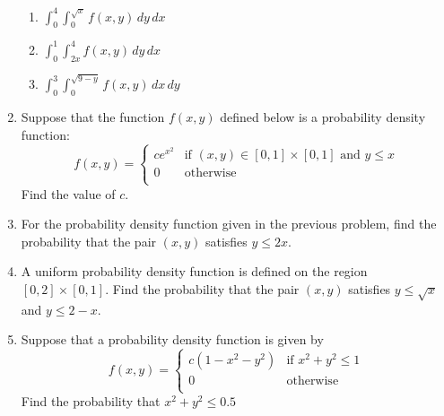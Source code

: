 \documentclass{article}
\begin{document}
\begin{enumerate}
\begin{enumerate}
         \item $ \int_0^4\int_{0}^{\sqrt{x}} f(x,y)\,dy\,dx$
         \item $ \int_0^1\int_{2x}^4 f(x,y)\,dy\,dx$
        \item $ \int_0^3\int_0^{\sqrt{9-y}}f(x,y)\,dx\,dy$
        \end{enumerate}
        \item Suppose that the function $f(x,y)$ defined below is a probability density function:
        $$ f(x,y) = \begin{cases} 
            ce^{x^2} & \text{if } (x,y) \in [0,1]\times [0,1] \text{ and } y \leq x\\
            0 & \text{otherwise} \\
            \end{cases}
        $$
        Find the value of $c$.
        \item For the probability density function given in the previous problem, find the probability that the pair $(x,y)$ satisfies $y \leq 2x$.
        \item A uniform probability density function is defined on the region $[0,2]\times[0,1]$. Find the probability that the pair $(x,y)$ satisfies $y \leq \sqrt{x}$ and $y \leq 2-x$.
       
       \item Suppose that a probability density function is given by 
       $$ f(x,y) = \begin{cases} 
            c(1-x^2-y^2) & \text{if } x^2+y^2\leq 1 \\
            0 & \text{otherwise} \\
            \end{cases}
        $$
        Find the probability that $x^2+y^2 \leq 0.5$

                \end{enumerate}
\end{document}
